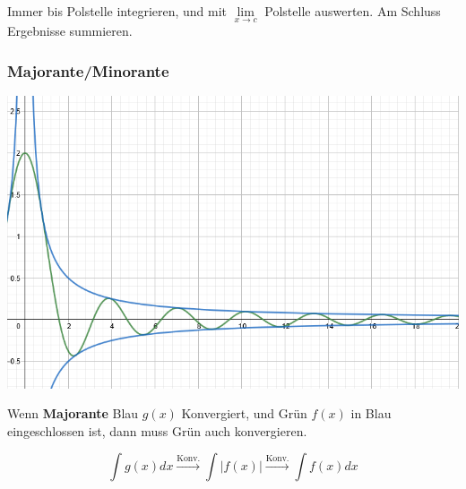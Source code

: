 \noindent Immer bis Polstelle integrieren, und mit $\lim\limits_{x\rightarrow c}$ Polstelle auswerten. Am Schluss Ergebnisse summieren.

\subsubsection{Majorante/Minorante}
\begin{center}
	\begin{minipage}{0.2\textwidth}
		\includegraphics[width=\linewidth]{Images/majorante}
	\end{minipage}%
	\begin{minipage}{0.25\textwidth}
		\noindent Wenn \textbf{Majorante} Blau $g(x)$ Konvergiert, und Grün $f(x)$ in Blau eingeschlossen ist, dann muss Grün auch konvergieren.
	\end{minipage}
\end{center}
\[\int g(x)dx \xrightarrow{\text{Konv.}} \int\left|f(x)\right| \xrightarrow{\text{Konv.}} \int f(x)dx \]

